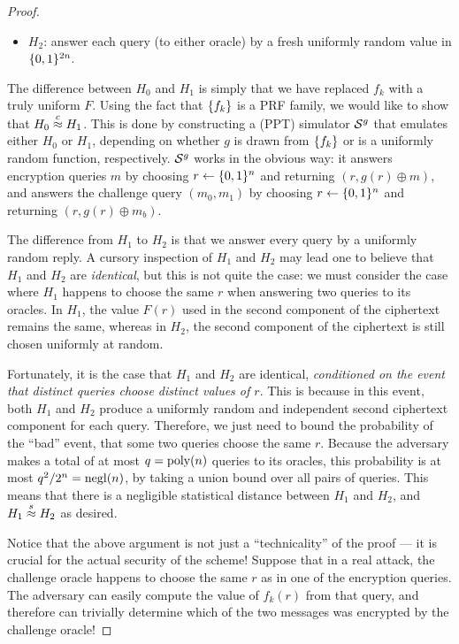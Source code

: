 \documentclass[11pt]{article}
\begin{document}
\begin{proof}
\begin{itemize}
  \item $H_{2}$: answer each query (to either oracle) by a fresh
    uniformly random value in $\{0,1\}^{2n}$.
  \end{itemize}

  The difference between $H_{0}$ and $H_{1}$ is simply that we have
  replaced $f_{k}$ with a truly uniform $F$.  Using the fact that
  $\{f_{k}\}$ is a PRF family, we would like to show that $H_{0}
  \stackrel{c}{\approx} H_{1}$.  This is done by constructing a (PPT) simulator
  $\mathcal{S}^{g}$ that emulates either $H_{0}$ or $H_{1}$, depending on
  whether $g$ is drawn from $\{f_{k}\}$ or is a uniformly random
  function, respectively.  $\mathcal{S}^{g}$ works in the obvious way: it
  answers encryption queries $m$ by choosing $r \gets \{0,1\}^{n}$ and
  returning $(r, g(r) \oplus m)$, and answers the challenge query
  $(m_{0}, m_{1})$ by choosing $r \gets \{0,1\}^{n}$ and returning $(r,
  g(r) \oplus m_{b})$.

  The difference from $H_{1}$ to $H_{2}$ is that we answer every query
  by a uniformly random reply.  A cursory inspection of $H_{1}$ and
  $H_{2}$ may lead one to believe that $H_{1}$ and $H_{2}$ are
  \emph{identical}, but this is not quite the case: we must consider
  the case where $H_{1}$ happens to choose the same $r$ when answering
  two queries to its oracles.  In $H_{1}$, the value $F(r)$ used in
  the second component of the ciphertext remains the same, whereas in
  $H_{2}$, the second component of the ciphertext is still chosen
  uniformly at random.

  Fortunately, it is the case that $H_{1}$ and $H_{2}$ are identical,
  \emph{conditioned on the event that distinct queries choose distinct
    values of $r$}.  This is because in this event, both $H_{1}$ and
  $H_{2}$ produce a uniformly random and independent second ciphertext
  component for each query.  Therefore, we just need to bound the
  probability of the ``bad'' event, that some two queries choose the
  same $r$.  Because the adversary makes a total of at most $q =
  \operatorname{poly}(n)$ queries to its oracles, this probability is at most
  $q^{2}/2^{n} = \operatorname{negl}(n)$, by taking a union bound over all pairs of
  queries.  This means that there is a negligible statistical distance
  between $H_{1}$ and $H_{2}$, and $H_{1} \stackrel{s}{\approx} H_{2}$ as desired.

  Notice that the above argument is not just a ``technicality'' of the
  proof --- it is crucial for the actual security of the scheme!
  Suppose that in a real attack, the challenge oracle happens to
  choose the same $r$ as in one of the encryption queries.  The
  adversary can easily compute the value of $f_{k}(r)$ from that
  query, and therefore can trivially determine which of the two
  messages was encrypted by the challenge oracle!
\end{proof}
\end{document}
